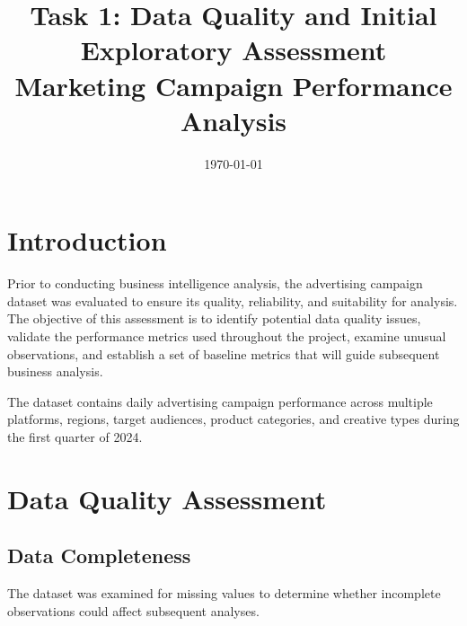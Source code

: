 \documentclass[11pt]{article}
\title{Task 1: Data Quality and Initial Exploratory Assessment\\
	Marketing Campaign Performance Analysis}
\author{}
\date{\today}
\begin{document}
	
	\maketitle
	
	\section{Introduction}
	
	Prior to conducting business intelligence analysis, the advertising campaign dataset was evaluated to ensure its quality, reliability, and suitability for analysis. The objective of this assessment is to identify potential data quality issues, validate the performance metrics used throughout the project, examine unusual observations, and establish a set of baseline metrics that will guide subsequent business analysis.
	
	The dataset contains daily advertising campaign performance across multiple platforms, regions, target audiences, product categories, and creative types during the first quarter of 2024.
	
	\section{Data Quality Assessment}
	
	\subsection{Data Completeness}
	
	The dataset was examined for missing values to determine whether incomplete observations could affect subsequent analyses.
	
\end{document}
